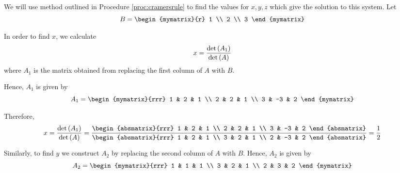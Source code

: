 \begin{solution} We will use method outlined in Procedure \ref{proc:cramersrule} to find the values for
$x,y,z$ which give the solution to this system. 
Let
\begin{equation*}
B = 
\begin{mymatrix}{r}
1 \\
2 \\
3
\end{mymatrix} 
\end{equation*}

In order to find $x$, we calculate
\begin{equation*}
x =
\vspace{0.05in}\frac{\det \tup{A_{1}}}{\det \tup{A}}
\end{equation*}
where $A_1$ is the matrix obtained from replacing the first column of $A$ with $B$.

Hence, $A_1$ is given by 
\begin{equation*}
A_1 = 
\begin{mymatrix}{rrr}
1 & 2 & 1 \\
2 & 2 & 1 \\
3 & -3 & 2
\end{mymatrix}
\end{equation*}

Therefore,
\begin{equation*}
x=
\vspace{0.05in}\frac{\det \tup{A_{1}}}{\det \tup{A}}
=
\vspace{0.05in}\frac{\begin{absmatrix}{rrr}
1 &  2 & 1 \\
2 &  2 & 1 \\
3 & -3 & 2
\end{absmatrix} }{\begin{absmatrix}{rrr}
1 & 2 & 1 \\
3 & 2 & 1 \\
2 & -3 & 2
\end{absmatrix} }=\vspace{0.05in}\frac{1}{2}
\end{equation*}

Similarly, to find $y$ we construct $A_2$ by replacing the second column of $A$ with $B$. Hence, $A_2$ is given by
\begin{equation*}
A_2
=
\begin{mymatrix}{rrr}
1 & 1 & 1 \\
3 & 2 & 1 \\
2 & 3 & 2
\end{mymatrix}
\end{equation*}


\end{solution}
